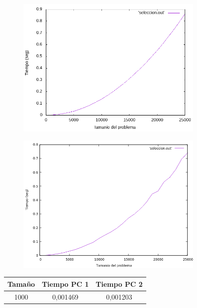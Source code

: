 \documentclass[12pt,spanish]{article}
\begin{document}
\begin{figure}[H]
\centering
\begin{subfigure}[b]{0.45\textwidth}
\includegraphics[scale=0.45]{empirica_seleccion.png}
\caption{}
\end{subfigure}
\quad
\begin{subfigure}[b]{0.45\textwidth}
\includegraphics[scale=0.45]{empirica_seleccion_2.png}
\caption{}
\end{subfigure}
\begin{tabular}{|c|c|c|}
\hline
\textbf{Tamaño} & \textbf{Tiempo PC 1} & \textbf{Tiempo PC 2} \\
\hline
1000 & 0,001469 & 0,001203 \\

\end{tabular}
\end{figure}
\end{document}
